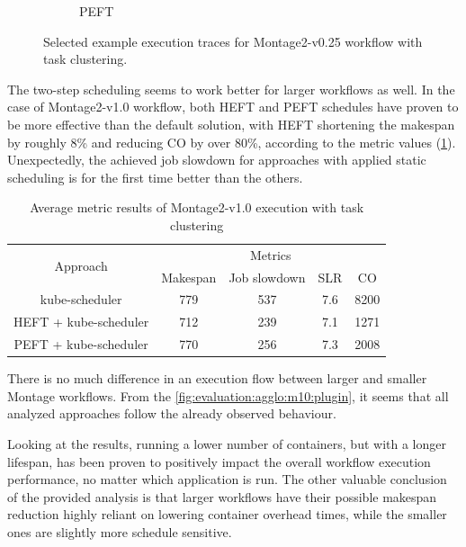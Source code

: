 \begin{figure}[H]
\begin{subfigure}{0.75\textwidth}
\caption[Selected example execution traces for Montage2-v0.25 workflow with PEFT and task clustering]{PEFT}
\label{fig:evaluation:agglo:m025:peft}
\end{subfigure}
\centering
\caption[Selected example execution traces for Montage2-v0.25 workflow with task clustering]{Selected example execution traces for Montage2-v0.25 workflow with task clustering.}
\label{fig:evaluation:agglo:m025:plugin}
\end{figure}


The two-step scheduling seems to work better for larger workflows as well.
In the case of Montage2-v1.0 workflow, both HEFT and PEFT schedules have proven to be more effective than the default solution, with HEFT shortening the makespan by roughly 8\% and reducing CO by over 80\%, according to the metric values (\cref{tab:metrics-clustering-m10}).
Unexpectedly, the achieved job slowdown for approaches with applied static scheduling is for the first time better than the others.


\begin{table}[H]
    \centering
    \begin{tabular}{|c|c|c|c|c|}
    \cline{1-5}
        \multirow{2}{*}{Approach} 
        &
        \multicolumn{4}{|c|}{Metrics} \\
    \cline{2-5}
        & Makespan & Job slowdown & SLR & CO \\
    \cline{1-5}
        kube-scheduler & 779 & 537 & 7.6 & 8200 \\
    \cline{1-5}
        HEFT + kube-scheduler & 712 & 239 & 7.1 & 1271 \\
    \cline{1-5}
        PEFT + kube-scheduler & 770 & 256 & 7.3 & 2008 \\
    \cline{1-5}
    \end{tabular}
    \caption{Average metric results of Montage2-v1.0 execution with task clustering}
    \label{tab:metrics-clustering-m10}
\end{table}

There is no much difference in an execution flow between larger and smaller Montage workflows.
From the \cref{fig:evaluation:agglo:m10:plugin}, it seems that all analyzed approaches follow the already observed behaviour.

Looking at the results, running a lower number of containers, but with a longer lifespan, has been proven to positively impact the overall workflow execution performance, no matter which application is run.
The other valuable conclusion of the provided analysis is that larger workflows have their possible makespan reduction highly reliant on lowering container overhead times, while the smaller ones are slightly more schedule sensitive.

